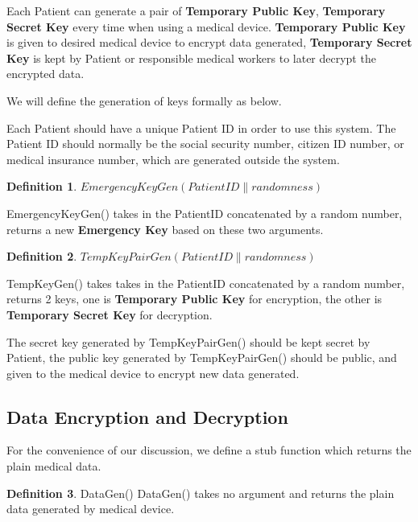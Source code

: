\documentclass[]{scrartcl}
\theoremstyle{definition}
\newtheorem{definition}{Definition}[section]
\begin{document}
Each Patient can generate a pair of \textbf{Temporary Public Key}, \textbf{Temporary Secret Key} every time when using a medical device. \textbf{Temporary Public Key} is given to desired medical device to encrypt data generated, \textbf{Temporary Secret Key} is kept by Patient or responsible medical workers to later decrypt the encrypted data.

We will define the generation of keys formally as below.

Each Patient should have a unique Patient ID in order to use this system. The Patient ID should normally be the social security number, citizen ID number, or medical insurance number, which are generated outside the system.

\begin{definition}{$EmergencyKeyGen(PatientID\|randomness)$}


EmergencyKeyGen() takes in the PatientID concatenated by a random number, returns a new \textbf{Emergency Key} based on these two arguments.
\end{definition}


\begin{definition}{$TempKeyPairGen(PatientID\|randomness)$}
	
TempKeyGen() takes takes in the PatientID concatenated by a random number, returns 2 keys, one is \textbf{Temporary Public Key} for encryption, the other is \textbf{Temporary Secret Key} for decryption.
\end{definition}

The secret key generated by TempKeyPairGen() should be kept secret by Patient, the public key generated by TempKeyPairGen() should be public, and given to the medical device to encrypt new data generated. 

\subsection{Data Encryption and Decryption}

For the convenience of our discussion, we define a stub function which returns the plain medical data.



\theoremstyle{definition}

\begin{definition}{DataGen()}
\newline
DataGen() takes no argument and returns the plain data generated by medical device.
\end{definition}
\end{document}
